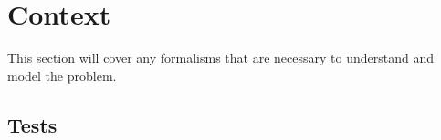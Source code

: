 \section{Context}
\label{sec:context}


This section will cover any formalisms that are necessary to understand and model the problem.

\subsection{\Flaky{} Tests}


